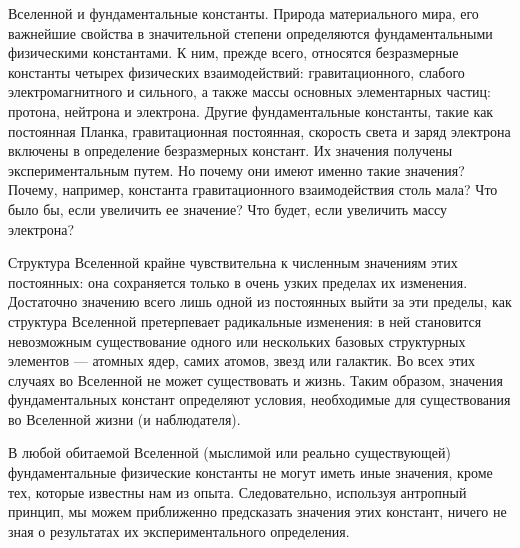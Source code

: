 \begin{itemize}
 Вселенной и фундаментальные константы. Природа материального мира, его важнейшие свойства в значительной степени определяются фундаментальными физическими константами. К ним, прежде всего, относятся безразмерные константы четырех физических взаимодействий: гравитационного, слабого электромагнитного и сильного, а также массы основных элементарных частиц: протона, нейтрона и электрона. Другие фундаментальные константы, такие как постоянная Планка, гравитационная постоянная, скорость света и заряд электрона включены в определение безразмерных констант. Их значения получены экспериментальным путем. Но почему они имеют именно такие значения? Почему, например, константа гравитационного взаимодействия столь мала? Что было бы, если увеличить ее значение? Что будет, если увеличить массу электрона? 
 \end{itemize}
 
 
Структура Вселенной крайне чувствительна к численным значениям этих постоянных: она сохраняется только в очень узких пределах их изменения. Достаточно значению всего лишь одной из постоянных выйти за эти пределы, как структура Вселенной претерпевает радикальные изменения: в ней становится невозможным существование одного или нескольких базовых структурных элементов --- атомных ядер, самих атомов, звезд или галактик. Во всех этих случаях во Вселенной не может существовать и жизнь. Таким образом, значения фундаментальных констант определяют условия, необходимые для существования во Вселенной жизни (и наблюдателя). 

В любой обитаемой Вселенной (мыслимой или реально существующей) фундаментальные физические константы не могут иметь иные значения, кроме тех, которые известны нам из опыта. Следовательно, используя антропный принцип, мы можем приближенно предсказать значения этих констант, ничего не зная о результатах их экспериментального определения. 


\clearpage
